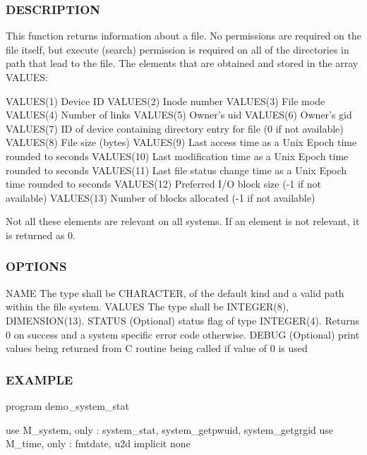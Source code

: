 \subsubsection*{D\+E\+S\+C\+R\+I\+P\+T\+I\+ON}

\begin{DoxyVerb}This function returns information about a file. No permissions are
required on the file itself, but execute (search) permission is required
on all of the directories in path that lead to the file.  The elements
that are obtained and stored in the array VALUES:

   VALUES(1) Device ID
   VALUES(2) Inode number
   VALUES(3) File mode
   VALUES(4) Number of links
   VALUES(5) Owner's uid
   VALUES(6) Owner's gid
   VALUES(7) ID of device containing directory entry for file (0 if not available)
   VALUES(8) File size (bytes)
   VALUES(9) Last access time as a Unix Epoch time rounded to seconds
   VALUES(10) Last modification time as a Unix Epoch time rounded to seconds
   VALUES(11) Last file status change time as a Unix Epoch time rounded to seconds
   VALUES(12) Preferred I/O block size (-1 if not available)
   VALUES(13) Number of blocks allocated (-1 if not available)

Not all these elements are relevant on all systems. If an element is
not relevant, it is returned as 0.
\end{DoxyVerb}


\subsubsection*{O\+P\+T\+I\+O\+NS}

\begin{DoxyVerb}NAME    The type shall be CHARACTER, of the default kind and a valid
        path within the file system.
VALUES  The type shall be INTEGER(8), DIMENSION(13).
STATUS  (Optional) status flag of type INTEGER(4). Returns 0 on success
        and a system specific error code otherwise.
DEBUG   (Optional) print values being returned from C routine being
        called if value of 0 is used
\end{DoxyVerb}


\subsubsection*{E\+X\+A\+M\+P\+LE}

program demo\+\_\+system\+\_\+stat

use M\+\_\+system, only \+: system\+\_\+stat, system\+\_\+getpwuid, system\+\_\+getgrgid use M\+\_\+time, only \+: fmtdate, u2d implicit none

